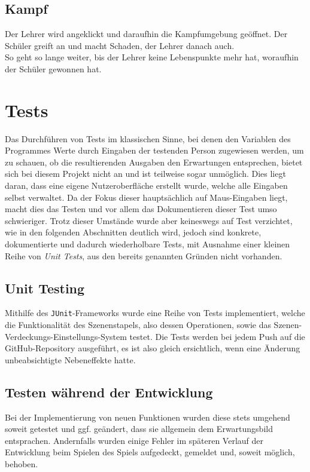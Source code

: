 \subsection{Kampf}

Der Lehrer wird angeklickt und daraufhin die Kampfumgebung geöffnet. Der Schüler greift an und macht Schaden, der Lehrer danach auch.\\
So geht so lange weiter, bis der Lehrer keine Lebenspunkte mehr hat, woraufhin der Schüler gewonnen hat.


\section{Tests}

Das Durchführen von Tests im klassischen Sinne, bei denen den Variablen des Programmes Werte durch Eingaben der testenden Person zugewiesen werden, um zu schauen, ob die resultierenden Ausgaben den Erwartungen entsprechen, bietet sich bei diesem Projekt nicht an und ist teilweise sogar unmöglich.
Dies liegt daran, dass eine eigene Nutzeroberfläche erstellt wurde, welche alle Eingaben selbst verwaltet.
Da der Fokus dieser hauptsächlich auf Maus-Eingaben liegt, macht dies das Testen und vor allem das Dokumentieren dieser Test umso schwieriger.
Trotz dieser Umstände wurde aber keineswegs auf Test verzichtet, wie in den folgenden Abschnitten deutlich wird, jedoch sind konkrete, dokumentierte und dadurch wiederholbare Tests, mit Ausnahme einer kleinen Reihe von \textit{Unit Tests}, aus den bereits genannten Gründen nicht vorhanden.

\subsection{Unit Testing}

Mithilfe des \texttt{JUnit}-Frameworks wurde eine Reihe von Tests implementiert,
welche die Funktionalität des Szenenstapels, also dessen Operationen, sowie das
Szenen-Verdeckungs-Einstellungs-System testet. Die Tests werden bei jedem Push
auf die GitHub-Repository ausgeführt, es ist also gleich ersichtlich, wenn eine
Änderung unbeabsichtigte Nebeneffekte hatte.

\subsection{Testen während der Entwicklung}

Bei der Implementierung von neuen Funktionen wurden diese stets umgehend soweit
getestet und ggf. geändert, dass sie allgemein dem Erwartungsbild entsprachen.
Andernfalls wurden einige Fehler im späteren Verlauf der Entwicklung beim Spielen
des Spiels aufgedeckt, gemeldet und, soweit möglich, behoben.

